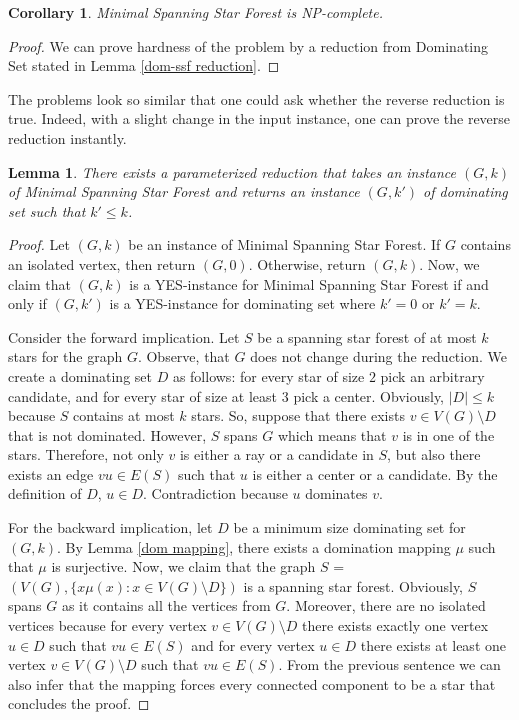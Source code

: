 \documentclass[en]{pracamgr}
\newtheorem{lemma}{Lemma}
\newtheorem{corollary}{Corollary}
\newcommand{\mssfp}{{\sc Minimal Spanning Star Forest}}
\newcommand{\domset}{dominating set}
\newcommand{\domsetp}{{\sc Dominating Set}}
\begin{document}
\begin{corollary}
	\mssfp{} is NP-complete.
\end{corollary}

\begin{proof}
	We can prove hardness of the problem by a reduction from \domsetp{} stated in Lemma \ref{dom-ssf reduction}.
\end{proof}

The problems look so similar that one could ask whether the reverse reduction is true. Indeed, with a slight change in the input instance, one can prove the reverse reduction instantly.

\begin{lemma}\label{ssf-dom reduction}
	There exists a parameterized reduction that takes an instance $(G,k)$ of \mssfp{} and returns an instance $(G,k')$ of \domset{} such that $k' \leq k$. 
\end{lemma}

\begin{proof}
	Let $(G,k)$ be an instance of \mssfp{}. If $G$ contains an isolated vertex, then return $(G,0)$. Otherwise, return $(G,k)$. Now, we claim that $(G,k)$ is a YES-instance for \mssfp{} if and only if $(G,k')$ is a YES-instance for \domset{} where $k'=0$ or $k'=k$.
	
	Consider the forward implication. Let $S$ be a spanning star forest of at most $k$ stars for the graph $G$. Observe, that $G$ does not change during the reduction. We create a dominating set $D$ as follows: for every star of size $2$ pick an arbitrary candidate, and for every star of size at least $3$ pick a center. Obviously, $|D| \leq k$ because $S$ contains at most $k$ stars. So, suppose that there exists $v \in V(G) \setminus D$ that is not dominated. However, $S$ spans $G$ which means that $v$ is in one of the stars. Therefore, not only $v$ is either a ray or a candidate in $S$, but also there exists an edge $vu \in E(S)$ such that $u$ is either a center or a candidate. By the definition of $D$, $u \in D$. Contradiction because $u$ dominates $v$.
	
	For the backward implication, let $D$ be a minimum size dominating set for $(G,k)$. By Lemma \ref{dom mapping}, there exists a domination mapping $\mu$ such that $\mu$ is surjective. Now, we claim that the graph $S$ = $(V(G), \{x\mu(x): x \in V(G) \setminus D\})$ is a spanning star forest. Obviously, $S$ spans $G$ as it contains all the vertices from $G$. Moreover, there are no isolated vertices because for every vertex $v \in V(G) \setminus D$ there exists exactly one vertex $u \in D$ such that $vu \in E(S)$ and for every vertex $u \in D$ there exists at least one vertex $v \in V(G) \setminus D$ such that $vu \in E(S)$. From the previous sentence we can also infer that the mapping forces every connected component to be a star that concludes the proof.
\end{proof}
\end{document}
